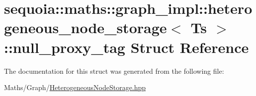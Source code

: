\hypertarget{structsequoia_1_1maths_1_1graph__impl_1_1heterogeneous__node__storage_1_1null__proxy__tag}{}\section{sequoia\+::maths\+::graph\+\_\+impl\+::heterogeneous\+\_\+node\+\_\+storage$<$ Ts $>$\+::null\+\_\+proxy\+\_\+tag Struct Reference}
\label{structsequoia_1_1maths_1_1graph__impl_1_1heterogeneous__node__storage_1_1null__proxy__tag}


The documentation for this struct was generated from the following file\+:\begin{DoxyCompactItemize}
\item 
Maths/\+Graph/\mbox{\hyperlink{_heterogeneous_node_storage_8hpp}{Heterogeneous\+Node\+Storage.\+hpp}}\end{DoxyCompactItemize}
